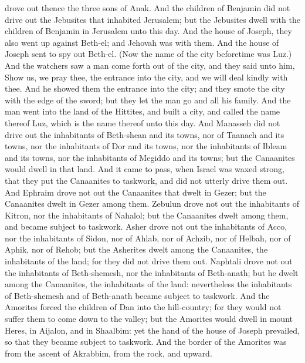drove out thence the three sons of Anak. And the children of Benjamin did not drive out the Jebusites that inhabited Jerusalem; but the Jebusites dwell with the children of Benjamin in Jerusalem unto this day.  And the house of Joseph, they also went up against Beth-el; and Jehovah was with them. And the house of Joseph sent to spy out Beth-el. (Now the name of the city beforetime was Luz.) And the watchers saw a man come forth out of the city, and they said unto him, Show us, we pray thee, the entrance into the city, and we will deal kindly with thee. And he showed them the entrance into the city; and they smote the city with the edge of the sword; but they let the man go and all his family. And the man went into the land of the Hittites, and built a city, and called the name thereof Luz, which is the name thereof unto this day.  And Manasseh did not drive out the inhabitants of Beth-shean and its towns, nor of Taanach and its towns, nor the inhabitants of Dor and its towns, nor the inhabitants of Ibleam and its towns, nor the inhabitants of Megiddo and its towns; but the Canaanites would dwell in that land. And it came to pass, when Israel was waxed strong, that they put the Canaanites to taskwork, and did not utterly drive them out.  And Ephraim drove not out the Canaanites that dwelt in Gezer; but the Canaanites dwelt in Gezer among them.  Zebulun drove not out the inhabitants of Kitron, nor the inhabitants of Nahalol; but the Canaanites dwelt among them, and became subject to taskwork.  Asher drove not out the inhabitants of Acco, nor the inhabitants of Sidon, nor of Ahlab, nor of Achzib, nor of Helbah, nor of Aphik, nor of Rehob; but the Asherites dwelt among the Canaanites, the inhabitants of the land; for they did not drive them out.  Naphtali drove not out the inhabitants of Beth-shemesh, nor the inhabitants of Beth-anath; but he dwelt among the Canaanites, the inhabitants of the land: nevertheless the inhabitants of Beth-shemesh and of Beth-anath became subject to taskwork.  And the Amorites forced the children of Dan into the hill-country; for they would not suffer them to come down to the valley; but the Amorites would dwell in mount Heres, in Aijalon, and in Shaalbim: yet the hand of the house of Joseph prevailed, so that they became subject to taskwork. And the border of the Amorites was from the ascent of Akrabbim, from the rock, and upward. 

